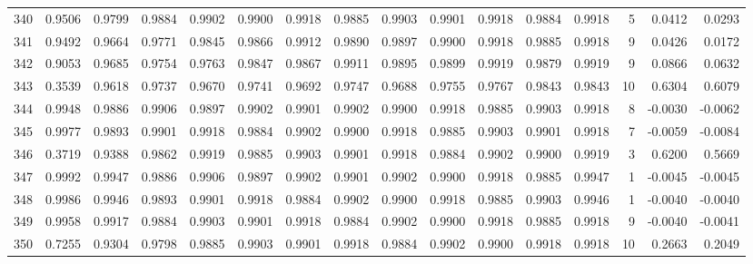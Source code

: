 \begin{tabular}{lrrrrrrrrrrrrrrr}
340 &      0.9506 &  0.9799 &  0.9884 &  0.9902 &  0.9900 &  0.9918 &  0.9885 &  0.9903 &  0.9901 &  0.9918 &   0.9884 &     0.9918 &      5 &                    0.0412 &                     0.0293 \\
341 &      0.9492 &  0.9664 &  0.9771 &  0.9845 &  0.9866 &  0.9912 &  0.9890 &  0.9897 &  0.9900 &  0.9918 &   0.9885 &     0.9918 &      9 &                    0.0426 &                     0.0172 \\
342 &      0.9053 &  0.9685 &  0.9754 &  0.9763 &  0.9847 &  0.9867 &  0.9911 &  0.9895 &  0.9899 &  0.9919 &   0.9879 &     0.9919 &      9 &                    0.0866 &                     0.0632 \\
343 &      0.3539 &  0.9618 &  0.9737 &  0.9670 &  0.9741 &  0.9692 &  0.9747 &  0.9688 &  0.9755 &  0.9767 &   0.9843 &     0.9843 &     10 &                    0.6304 &                     0.6079 \\
344 &      0.9948 &  0.9886 &  0.9906 &  0.9897 &  0.9902 &  0.9901 &  0.9902 &  0.9900 &  0.9918 &  0.9885 &   0.9903 &     0.9918 &      8 &                   -0.0030 &                    -0.0062 \\
345 &      0.9977 &  0.9893 &  0.9901 &  0.9918 &  0.9884 &  0.9902 &  0.9900 &  0.9918 &  0.9885 &  0.9903 &   0.9901 &     0.9918 &      7 &                   -0.0059 &                    -0.0084 \\
346 &      0.3719 &  0.9388 &  0.9862 &  0.9919 &  0.9885 &  0.9903 &  0.9901 &  0.9918 &  0.9884 &  0.9902 &   0.9900 &     0.9919 &      3 &                    0.6200 &                     0.5669 \\
347 &      0.9992 &  0.9947 &  0.9886 &  0.9906 &  0.9897 &  0.9902 &  0.9901 &  0.9902 &  0.9900 &  0.9918 &   0.9885 &     0.9947 &      1 &                   -0.0045 &                    -0.0045 \\
348 &      0.9986 &  0.9946 &  0.9893 &  0.9901 &  0.9918 &  0.9884 &  0.9902 &  0.9900 &  0.9918 &  0.9885 &   0.9903 &     0.9946 &      1 &                   -0.0040 &                    -0.0040 \\
349 &      0.9958 &  0.9917 &  0.9884 &  0.9903 &  0.9901 &  0.9918 &  0.9884 &  0.9902 &  0.9900 &  0.9918 &   0.9885 &     0.9918 &      9 &                   -0.0040 &                    -0.0041 \\
350 &      0.7255 &  0.9304 &  0.9798 &  0.9885 &  0.9903 &  0.9901 &  0.9918 &  0.9884 &  0.9902 &  0.9900 &   0.9918 &     0.9918 &     10 &                    0.2663 &                     0.2049 \\

\end{tabular}
